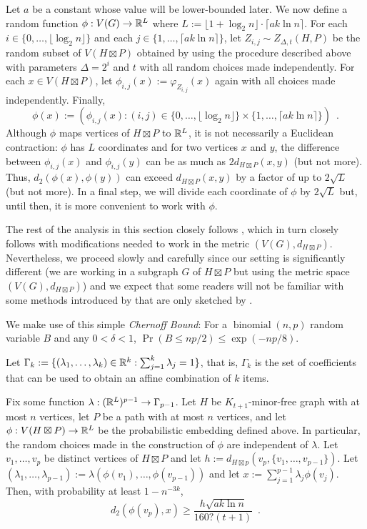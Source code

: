 \documentclass{patmorin}
\renewcommand{\ge}{\geqslant}
\renewcommand{\le}{\leqslant}
\newcommand{\defin}[1]{\emph{\textcolor{brightmaroon}{#1}}}
\begin{document}
Let $a$ be a constant whose value will be lower-bounded later.  We now define a random function $\phi:V(G)\to\mathbb{R}^{L}$ where $L:=\lfloor 1+\log_2 n\rfloor\cdot\lceil a k\ln n\rceil$. For each $i\in\{0,\ldots,\lfloor \log_2 n\rfloor\}$ and each $j\in\{1,\ldots,\lceil a k\ln n\rceil\}$, let $Z_{i,j}\sim Z_{\Delta,t}(H,P)$ be the random subset of $V(H\boxtimes P)$ obtained by using the procedure described above with parameters $\Delta=2^i$ and $t$ with all random choices made independently.  For each $x\in V(H\boxtimes P)$, let $\phi_{i,j}(x):= \varphi_{Z_{i,j}}(x)$ again with all choices made independently.  Finally,
\[
   \phi(x) := \left(\phi_{i,j}(x):(i,j)\in \{0,\ldots,\lfloor \log_2 n\rfloor\}\times\{1,\ldots,\lceil a k\ln n\rceil\}\right) \enspace .
\]
Although $\phi$ maps vertices of $H\boxtimes P$ to $\mathbb{R}^L$, it is not necessarily a Euclidean contraction: $\phi$ has $L$ coordinates and for two vertices $x$ and $y$, the difference between $\phi_{i,j}(x)$ and $\phi_{i,j}(y)$ can be as much as $2d_{H\boxtimes P}(x,y)$ (but not more).  Thus, $d_2(\phi(x),\phi(y))$ can exceed $d_{H\boxtimes P}(x,y)$ by a factor of up to $2\sqrt{L}$ (but not more).  In a final step, we will divide each coordinate of $\phi$ by $2\sqrt{L}$ but, until then, it is more convenient to work with $\phi$.

The rest of the analysis in this section closely follows \citet{rao:small}, which in turn closely follows \citet{feige:approximating} with modifications needed to work in the metric $(V(G),d_{H\boxtimes P})$.  Nevertheless, we proceed slowly and carefully since our setting is significantly different (we are working in a subgraph $G$ of $H\boxtimes P$ but using the metric space $(V(G),d_{H\boxtimes P})$) and we expect that some readers will not be familiar with some methods introduced by \citet{feige:approximating} that are only sketched by \citet{rao:small}.

We make use of this simple \defin{Chernoff Bound}: For a $\operatorname{binomial}(n,p)$ random variable $B$ and any $0<\delta<1$, $\Pr(B \le np/2) \le \exp(-np/8)$.

Let $\Gamma_k:=\{(\lambda_1,\ldots,\lambda_k)\in \mathbb{R}^k:\sum_{j=1}^k\lambda_j=1\}$, that is, $\Gamma_k$ is the set of coefficients that can be used to obtain an affine combination of $k$ items.


\begin{lem}\label{crux}
  Fix some function $\lambda:(\mathbb{R}^{L})^{p-1}\to \Gamma_{p-1}$. Let $H$ be $K_{t+1}$-minor-free graph with at most $n$ vertices, let $P$ be a path with at most $n$ vertices, and let $\phi:V(H\boxtimes P)\to\mathbb{R}^L$ be the probabilistic embedding defined above. In particular, the random choices made in the construction of $\phi$ are independent of $\lambda$.  Let $v_1,\ldots,v_p$ be distinct vertices of $H\boxtimes P$ and let $h:=d_{H\boxtimes p}(v_p,\{v_1,\ldots,v_{p-1}\})$.  Let $(\lambda_1,\ldots,\lambda_{p-1}):=\lambda(\phi(v_1),\ldots,\phi(v_{p-1}))$ and let $x:=\sum_{j=1}^{p-1}\lambda_j\phi(v_j)$.
  Then, with probability at least $1-n^{-3k}$,
  \[
    d_2(\phi(v_p),x)\ge \frac{h\sqrt{ak\ln n}}{160?(t+1)} \enspace
  . \]
\end{lem}
\end{document}
